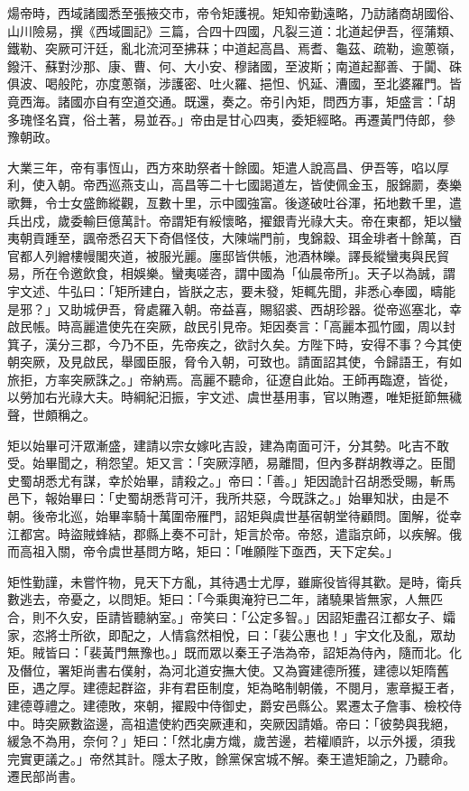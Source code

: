 \begin{pinyinscope}
 煬帝時，西域諸國悉至張掖交市，帝令矩護視。矩知帝勤遠略，乃訪諸商胡國俗、山川險易，撰《西域圖記》三篇，合四十四國，凡裂三道：北道起伊吾，徑蒲類、鐵勒、突厥可汗廷，亂北流河至拂菻；中道起高昌、焉耆、龜茲、疏勒，逾蔥嶺，鏺汗、蘇對沙那、康、曹、何、大小安、穆諸國，至波斯；南道起鄯善、于闐、硃俱波、喝般陀，亦度蔥嶺，涉護密、吐火羅、挹怛、忛延、漕國，至北婆羅門。皆竟西海。諸國亦自有空道交通。既還，奏之。帝引內矩，問西方事，矩盛言：「胡多瑰怪名寶，俗土著，易並吞。」帝由是甘心四夷，委矩經略。再遷黃門侍郎，參豫朝政。



 大業三年，帝有事恆山，西方來助祭者十餘國。矩遣人說高昌、伊吾等，啗以厚利，使入朝。帝西巡燕支山，高昌等二十七國謁道左，皆使佩金玉，服錦罽，奏樂歌舞，令士女盛飾縱觀，亙數十里，示中國強富。後遂破吐谷渾，拓地數千里，遣兵出戍，歲委輸巨億萬計。帝謂矩有綏懷略，擢銀青光祿大夫。帝在東都，矩以蠻夷朝貢踵至，諷帝悉召天下奇倡怪伎，大陳端門前，曳錦縠、珥金琲者十餘萬，百官都人列繒樓幔閣夾道，被服光麗。廛邸皆供帳，池酒林皪。譯長縱蠻夷與民貿易，所在令邀飲食，相娛樂。蠻夷嗟咨，謂中國為「仙晨帝所」。天子以為誠，謂宇文述、牛弘曰：「矩所建白，皆朕之志，要未發，矩輒先聞，非悉心奉國，疇能是邪？」又助城伊吾，脅處羅入朝。帝益喜，賜貂裘、西胡珍器。從帝巡塞北，幸啟民帳。時高麗遣使先在突厥，啟民引見帝。矩因奏言：「高麗本孤竹國，周以封箕子，漢分三郡，今乃不臣，先帝疾之，欲討久矣。方陛下時，安得不事？今其使朝突厥，及見啟民，舉國臣服，脅令入朝，可致也。請面詔其使，令歸語王，有如旅拒，方率突厥誅之。」帝納焉。高麗不聽命，征遼自此始。王師再臨遼，皆從，以勞加右光祿大夫。時綱紀汩振，宇文述、虞世基用事，官以賄遷，唯矩挺節無穢聲，世頗稱之。



 矩以始畢可汗眾漸盛，建請以宗女嫁叱吉設，建為南面可汗，分其勢。叱吉不敢受。始畢聞之，稍怨望。矩又言：「突厥淳陋，易離間，但內多群胡教導之。臣聞史蜀胡悉尤有謀，幸於始畢，請殺之。」帝曰：「善。」矩因詭計召胡悉受賜，斬馬邑下，報始畢曰：「史蜀胡悉背可汗，我所共惡，今既誅之。」始畢知狀，由是不朝。後帝北巡，始畢率騎十萬圍帝雁門，詔矩與虞世基宿朝堂待顧問。圍解，從幸江都宮。時盜賊蜂結，郡縣上奏不可計，矩言於帝。帝怒，遣詣京師，以疾解。俄而高祖入關，帝令虞世基問方略，矩曰：「唯願陛下亟西，天下定矣。」



 矩性勤謹，未嘗忤物，見天下方亂，其待遇士尤厚，雖廝役皆得其歡。是時，衛兵數逃去，帝憂之，以問矩。矩曰：「今乘輿淹狩已二年，諸驍果皆無家，人無匹合，則不久安，臣請皆聽納室。」帝笑曰：「公定多智。」因詔矩盡召江都女子、孀家，恣將士所欲，即配之，人情翕然相悅，曰：「裴公惠也！」宇文化及亂，眾劫矩。賊皆曰：「裴黃門無豫也。」既而眾以秦王子浩為帝，詔矩為侍內，隨而北。化及僭位，署矩尚書右僕射，為河北道安撫大使。又為竇建德所獲，建德以矩隋舊臣，遇之厚。建德起群盜，非有君臣制度，矩為略制朝儀，不閱月，憲章擬王者，建德尊禮之。建德敗，來朝，擢殿中侍御史，爵安邑縣公。累遷太子詹事、檢校侍中。時突厥數盜邊，高祖遣使約西突厥連和，突厥因請婚。帝曰：「彼勢與我絕，緩急不為用，奈何？」矩曰：「然北虜方熾，歲苦邊，若權順許，以示外援，須我完實更議之。」帝然其計。隱太子敗，餘黨保宮城不解。秦王遣矩諭之，乃聽命。遷民部尚書。




\end{pinyinscope}
